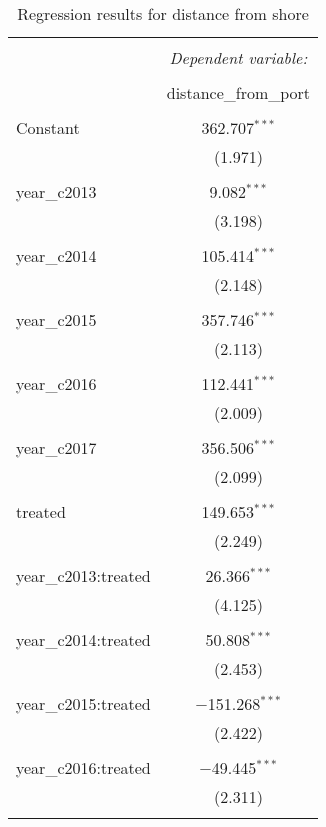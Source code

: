 \documentclass[11pt,]{article}
\begin{document}
\begin{table}[!htbp] \centering 
  \caption{\label{tab:dist_port}Regression results for distance from shore} 
  \label{} 
\begin{tabular}{@{\extracolsep{5pt}}lc} 
\\[-1.8ex]\hline 
\hline \\[-1.8ex] 
 & \multicolumn{1}{c}{\textit{Dependent variable:}} \\ 
\cline{2-2} 
\\[-1.8ex] & distance\_from\_port \\ 
\hline \\[-1.8ex] 
 Constant & 362.707$^{***}$ \\ 
  & (1.971) \\ 
  & \\ 
 year\_c2013 & 9.082$^{***}$ \\ 
  & (3.198) \\ 
  & \\ 
 year\_c2014 & 105.414$^{***}$ \\ 
  & (2.148) \\ 
  & \\ 
 year\_c2015 & 357.746$^{***}$ \\ 
  & (2.113) \\ 
  & \\ 
 year\_c2016 & 112.441$^{***}$ \\ 
  & (2.009) \\ 
  & \\ 
 year\_c2017 & 356.506$^{***}$ \\ 
  & (2.099) \\ 
  & \\ 
 treated & 149.653$^{***}$ \\ 
  & (2.249) \\ 
  & \\ 
 year\_c2013:treated & 26.366$^{***}$ \\ 
  & (4.125) \\ 
  & \\ 
 year\_c2014:treated & 50.808$^{***}$ \\ 
  & (2.453) \\ 
  & \\ 
 year\_c2015:treated & $-$151.268$^{***}$ \\ 
  & (2.422) \\ 
  & \\ 
 year\_c2016:treated & $-$49.445$^{***}$ \\ 
  & (2.311) \\ 
  & \\ 

\end{tabular}
\end{table}
\end{document}
